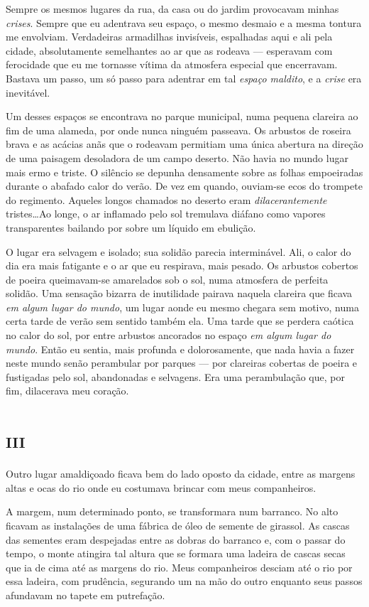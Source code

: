 Sempre os mesmos lugares da rua, da casa ou do jardim provocavam minhas \textit{crises}. Sempre que eu adentrava seu espaço, o mesmo desmaio e a mesma tontura me envolviam. Verdadeiras armadilhas invisíveis, espalhadas aqui e ali pela cidade, absolutamente semelhantes ao ar que as rodeava --- esperavam com ferocidade que eu me tornasse vítima da atmosfera especial que encerravam. Bastava um passo, um só passo para adentrar em tal \textit{espaço maldito}, e a \textit{crise} era inevitável.

Um desses espaços se encontrava no parque municipal, numa pequena clareira ao fim de uma alameda, por onde nunca ninguém passeava. Os arbustos de roseira brava e as acácias anãs que o rodeavam permitiam uma única abertura na direção de uma paisagem desoladora de um campo deserto. Não havia no mundo lugar mais ermo e triste. O silêncio se depunha densamente sobre as folhas empoeiradas durante o abafado calor do verão. De vez em quando, ouviam-se ecos do trompete do regimento. Aqueles longos chamados no deserto eram \textit{dilacerantemente} tristes\dots Ao longe, o ar inflamado pelo sol tremulava diáfano como vapores transparentes bailando por sobre um líquido em ebulição.

O lugar era selvagem e isolado; sua solidão parecia interminável. Ali, o calor do dia era mais fatigante e o ar que eu respirava, mais pesado. Os arbustos cobertos de poeira queimavam-se amarelados sob o sol, numa atmosfera de perfeita solidão. Uma sensação bizarra de inutilidade pairava naquela clareira que ficava \textit{em algum lugar do mundo}, um lugar aonde eu mesmo chegara sem motivo, numa certa tarde de verão sem sentido também ela. Uma tarde que se perdera caótica no calor do sol, por entre arbustos ancorados no espaço \textit{em algum lugar do mundo}. Então eu sentia, mais profunda e dolorosamente, que nada havia a fazer neste mundo senão perambular por parques --- por clareiras cobertas de poeira e fustigadas pelo sol, abandonadas e selvagens. Era uma perambulação que, por fim, dilacerava meu coração.


\chapter*{\huge\centering\textsc{iii}}

Outro lugar amaldiçoado ficava bem do lado oposto da cidade, entre as margens altas e ocas do rio onde eu costumava brincar com meus companheiros.

A margem, num determinado ponto, se transformara num barranco. No alto ficavam as instalações de uma fábrica de óleo de semente de girassol. As cascas das sementes eram despejadas entre as dobras do barranco e, com o passar do tempo, o monte atingira tal altura que se formara uma ladeira de cascas secas que ia de cima até as margens do rio.
Meus companheiros desciam até o rio por essa ladeira, com prudência, segurando um na mão do outro enquanto seus passos afundavam no tapete em putrefação.

